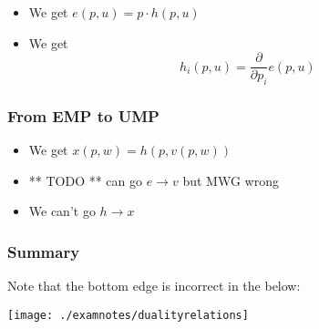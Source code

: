 \begin{itemize}
\item We get $e(p,u) = p \cdot h(p,u)$
\item We get 
  \[
  h_i(p,u) = \frac{\partial}{\partial p_i} e(p,u)
  \]
\end{itemize}

\subsubsection{From EMP to UMP}
\label{sec:from-emp-ump}

\begin{itemize}
\item We get $x(p,w) = h(p, v(p,w))$
\item ** TODO ** can go $e \to v$ but MWG wrong
\item We can't go $h \to x$
\end{itemize}

\subsubsection{Summary}
\label{sec:eu-duality-summary}

Note that the bottom edge is incorrect in the below:

\texttt{[image: ./examnotes/dualityrelations]}
